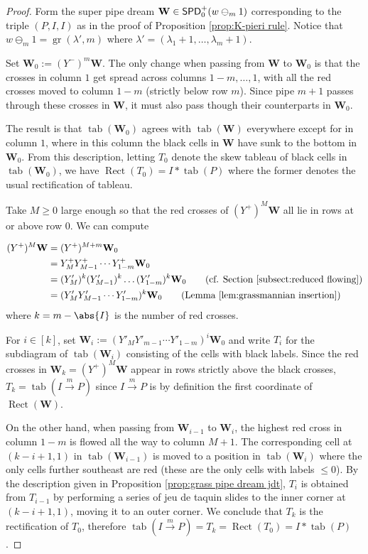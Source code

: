\documentclass[11pt,reqno]{amsart} %
\newcommand{\bfW}{\mathbf{W}}
\newcommand{\msert}{\overset{m}{\rightarrow}}
\DeclareMathOperator{\Grass}{gr}
\DeclareMathOperator{\SPD}{\sf{SPD}}
\DeclareMathOperator{\tab}{tab}
\DeclareMathOperator{\Rect}{Rect} %
\theoremstyle{definition}
\begin{document}
\begin{proof}
Form the super pipe dream $\bfW\in \SPD_0^+(w\ominus_m 1)$ corresponding to the triple $(P,I,I)$ as in the proof of Proposition \ref{prop:K-pieri rule}.
Notice that $w\ominus_m 1 = \Grass(\lambda',m)$ where $\lambda' = (\lambda_1+1,\dots,\lambda_m+1)$.

Set $\bfW_0 := (Y^-)^m\bfW$.
The only change when passing from $\bfW$ to $\bfW_0$ is that the crosses in column $1$ get spread across columns $1-m,\dots,1$, with all the red crosses moved to column $1-m$ (strictly below row $m$).
Since pipe $m+1$ passes through these crosses in $\bfW$, it must also pass though their counterparts in $\bfW_0$.

The result is that $\tab(\bfW_0)$ agrees with $\tab(\bfW)$ everywhere except for in column $1$, where in this column the black cells in $\bfW$ have sunk to the bottom in $\bfW_0$.
From this description, letting $T_0$ denote the skew tableau of black cells in $\tab(\bfW_0)$, we have $\Rect(T_0) = I*\tab(P)$ where the former denotes the usual rectification of tableau.

Take $M\geq 0$ large enough so that the red crosses of $(Y^+)^M\bfW$ all lie in rows at or above row $0$.
We can compute

\begin{align*}
    (Y^+)^M \bfW
    &= (Y^+)^{M+m} \bfW_0 \\
    &= Y^+_MY^+_{M-1}\cdots Y^+_{1-m} \bfW_0 \\
    &= (Y'_M)^k(Y'_{M-1})^k\dots (Y'_{1-m})^k \bfW_0 \tag{cf. Section \ref{subsect:reduced flowing}} \\
    &= (Y'_M Y'_{M-1} \cdots Y'_{1-m})^k \bfW_0
    \tag{Lemma \ref{lem:grassmannian insertion}}
\end{align*}
where $k = m - \abs{I}$ is the number of red crosses.

For $i\in [k]$, set $\bfW_i := (Y'_M Y'_{m-1} \cdots Y'_{1-m})^i \bfW_0$ and write $T_i$ for the subdiagram of $\tab(\bfW_i)$ consisting of the cells with black labels.
Since the red crosses in $\bfW_k = (Y^+)^M\bfW$ appear in rows strictly above the black crosses, $T_k = \tab(I\msert P)$ since $I\msert P$ is by definition the first coordinate of $\Rect(\bfW)$.

On the other hand, when passing from $\bfW_{i-1}$ to $\bfW_i$, the highest red cross in column $1-m$ is flowed all the way to column $M+1$.
The corresponding cell at $(k-i+1,1)$ in $\tab(\bfW_{i-1})$ is moved to a position in $\tab(\bfW_i)$ where the only cells further southeast are red (these are the only cells with labels $\leq 0$).
By the description given in Proposition \ref{prop:grass pipe dream jdt}, $T_i$ is obtained from $T_{i-1}$ by performing a series of jeu de taquin slides to the inner corner at $(k-i+1,1)$, moving it to an outer corner.
We conclude that $T_k$ is the rectification of $T_0$, therefore $\tab(I\msert P) = T_k = \Rect(T_0) = I * \tab(P)$.
\end{proof}
\end{document}
